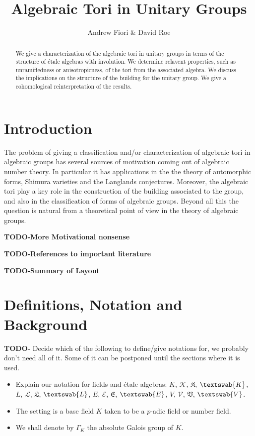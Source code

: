 \documentclass{article}
\title{Algebraic Tori in Unitary Groups}
\author{Andrew Fiori \& David Roe}
\theoremstyle{plain}
\theoremstyle{definition}
\newcommand{\GalKbK}{\Gamma_K}
\newcommand{\TODO}[1]{\textbf{TODO-#1}}
\newcommand{\aK}{K}
\newcommand{\gK}{\mathcal{K}}
\newcommand{\lK}{\mathfrak{K}}
\newcommand{\fK}{\textswab{K}}
\newcommand{\aL}{L}
\newcommand{\gL}{\mathcal{L}}
\newcommand{\lL}{\mathfrak{L}}
\newcommand{\fL}{\textswab{L}}
\newcommand{\aE}{E}
\newcommand{\gE}{\mathcal{E}}
\newcommand{\lE}{\mathfrak{E}}
\newcommand{\fE}{\textswab{E}}
\newcommand{\aV}{V}
\newcommand{\gV}{\mathcal{V}}
\newcommand{\lV}{\mathfrak{V}}
\newcommand{\fV}{\textswab{V}}
\begin{document}
\maketitle

\begin{abstract}
We give a characterization of the algebraic tori in unitary groups in terms of the structure of \'etale algebras with involution. We determine relavent properties, such as unramifiedness or anisotropicness, of the tori from the associated algebra. We discuss the implications on the structure of the building for the unitary group. We give a cohomological reinterpretation of the results.
\end{abstract}

\tableofcontents

\section{Introduction}

The problem of giving a classification and/or characterization of algebraic tori in algebraic groups has several sources of motivation coming out of algebraic number theory. In particular it has applications in the the theory of automorphic forms, Shimura varieties and the Langlands conjectures. Moreover, the algebraic tori play a key role in the construction of the building associated to the group, and also in the classification of forms of algebraic groups. Beyond all this the question is natural from a theoretical point of view in the theory of algebraic groups.  

\TODO{More Motivational nonsense}

\TODO{References to important literature}

\TODO{Summary of Layout}

\section{Definitions, Notation and Background}

\TODO{} Decide which of the following to define/give notations for, we probably don't need all of it. Some of it can be postponed until the sections where it is used.
\begin{itemize}
\item Explain our notation for fields and \'etale algebras: $\aK$, $\gK$, $\lK$, $\fK$, $\aL$, $\gL$, $\lL$, $\fL$, $\aE$, $\gE$, $\lE$, $\fE$, $\aV$, $\gV$, $\lV$, $\fV$.
\item The setting is a base field $K$ taken to be a $p$-adic field or number field.
\item We shall denote by $\GalKbK$ the absolute Galois group of $K$.


\end{itemize}
\end{document}
